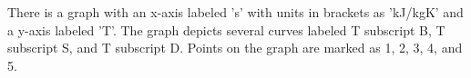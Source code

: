 There is a graph with an x-axis labeled 's' with units in brackets as 'kJ/kgK' and a y-axis labeled 'T'. The graph depicts several curves labeled T subscript B, T subscript S, and T subscript D. Points on the graph are marked as 1, 2, 3, 4, and 5.